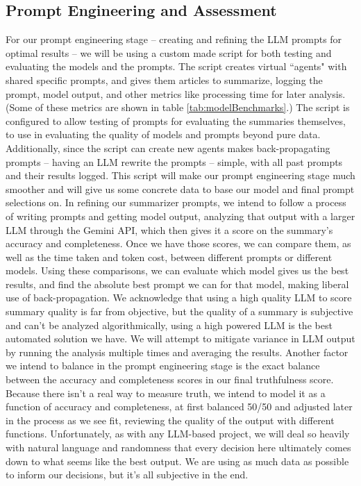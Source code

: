 \documentclass[conference]{IEEEtran}
\begin{document}
\subsection{Prompt Engineering and Assessment} %
For our prompt engineering stage -- creating and refining the LLM prompts for optimal results -- we will be using a custom made script for both testing and evaluating the models and the prompts. The script creates virtual ``agents" with shared specific prompts, and gives them articles to summarize, logging the prompt, model output, and other metrics like processing time for later analysis. (Some of these metrics are shown in table \ref{tab:modelBenchmarks}.) The script is configured to allow testing of prompts for evaluating the summaries themselves, to use in evaluating the quality of models and prompts beyond pure data. Additionally, since the script can create new agents makes back-propagating prompts -- having an LLM rewrite the prompts -- simple, with all past prompts and their results logged. This script will make our prompt engineering stage much smoother and will give us some concrete data to base our model and final prompt selections on. 
In refining our summarizer prompts, we intend to follow a process of writing prompts and getting model output, analyzing that output with a larger LLM through the Gemini API, which then gives it a score on the summary's accuracy and completeness. Once we have those scores, we can compare them, as well as the time taken and token cost, between different prompts or different models. Using these comparisons, we can evaluate which model gives us the best results, and find the absolute best prompt we can for that model, making liberal use of back-propagation. We acknowledge that using a high quality LLM to score summary quality is far from objective, but the quality of a summary is subjective and can't be analyzed algorithmically, using a high powered LLM is the best automated solution we have. We will attempt to mitigate variance in LLM output by running the analysis multiple times and averaging the results.
Another factor we intend to balance in the prompt engineering stage is the exact balance between the accuracy and completeness scores in our final truthfulness score. Because there isn't a real way to measure truth, we intend to model it as a function of accuracy and completeness, at first balanced 50/50 and adjusted later in the process as we see fit, reviewing the quality of the output with different functions. Unfortunately, as with any LLM-based project, we will deal so heavily with natural language and randomness that every decision here ultimately comes down to what seems like the best output. We are using as much data as possible to inform our decisions, but it's all subjective in the end.
\end{document}
